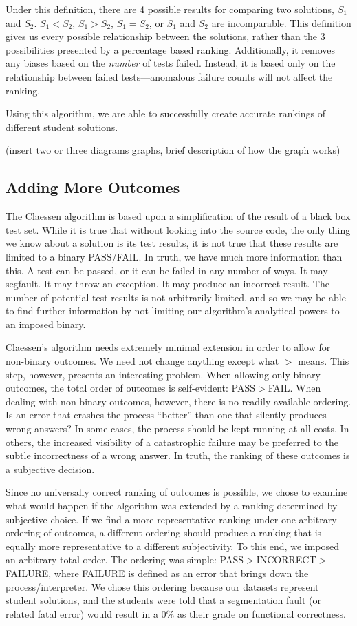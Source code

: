 \documentclass[11pt]{article}
\begin{document}
Under this definition, there are 4 possible results for comparing two solutions, $S_1$ and $S_2$. $S_1 < S_2$, $S_1 > S_2$, $S_1 = S_2$, or $S_1$ and $S_2$  are incomparable. This definition gives us every possible relationship between the solutions, rather than the 3 possibilities presented by a percentage based ranking. Additionally, it removes any biases based on the \emph{number} of tests failed. Instead, it is based only on the relationship between failed tests---anomalous failure counts will not affect the ranking.

Using this algorithm, we are able to successfully create accurate rankings of different student solutions.

(insert two or three diagrams graphs, brief description of how the graph works)
\subsection{Adding More Outcomes}
The Claessen algorithm is based upon a simplification of the result of a black box test set. While it is true that without looking into the source code, the only thing we know about a solution is its test results, it is not true that these results are limited to a binary PASS/FAIL. In truth, we have much more information than this. A test can be passed, or it can be failed in any  number of ways. It may segfault. It may throw an exception. It may produce an incorrect result. The number of potential test results is not arbitrarily limited, and so we may be able to find further information by not limiting our algorithm's analytical powers to an imposed binary.

Claessen's algorithm needs extremely minimal extension in order to allow for non-binary outcomes. We need not change anything except what $>$ means. This step, however, presents an interesting problem. When allowing only binary outcomes, the total order of outcomes is self-evident: PASS$>$FAIL. When dealing with non-binary outcomes, however, there is no readily available ordering. Is an error that crashes the process ``better'' than one that silently produces wrong answers? In some cases, the process should be kept running at all costs. In others, the increased visibility of a catastrophic failure may be preferred to the subtle incorrectness of a wrong answer. In truth, the ranking of these outcomes is a subjective decision.

Since no universally correct ranking of outcomes is possible, we chose to examine what would happen if the algorithm was extended by a ranking determined by subjective choice. If we find a more representative ranking under one arbitrary ordering of outcomes, a different ordering should produce a ranking that is equally more representative to a different subjectivity. To this end, we imposed an arbitrary total order. The ordering was simple: PASS$>$INCORRECT$>$FAILURE, where FAILURE is defined as an error that brings down the process/interpreter. We chose this ordering because our datasets represent student solutions, and the students were told that a segmentation fault (or related fatal error) would result in a 0\% as their grade on functional correctness.
\end{document}
